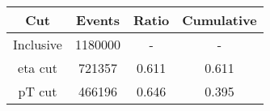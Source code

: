 \begin{tabular}{|c||c|c|c|}
\hline
Cut & Events & Ratio & Cumulative \\\hline
Inclusive & 1180000 & - & - \\
eta cut & 721357 & 0.611 & 0.611 \\
pT cut & 466196 & 0.646 & 0.395 \\
\hline
\end{tabular}
